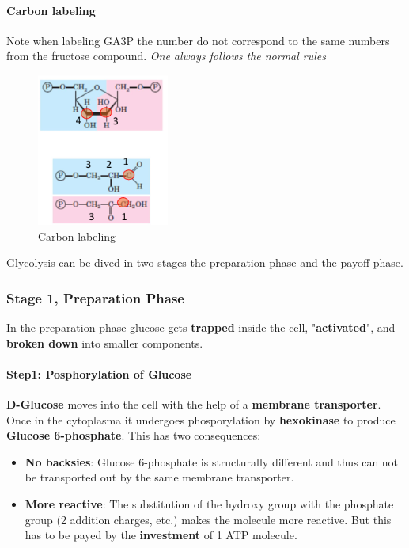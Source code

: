 \documentclass[../main.tex]{subfiles}
\begin{document}
\paragraph{Carbon labeling}
Note when labeling GA3P the number do not correspond to the same numbers from the fructose compound. \textit{One always follows the normal rules}
\begin{figure}[H]
	\centering
	\includegraphics[height = 5cm]{labeling}
	\caption{Carbon labeling}
\end{figure}

Glycolysis can be dived in two stages the preparation phase and the payoff phase. 

\subsubsection{Stage 1, Preparation Phase}
In the preparation phase glucose gets \textbf{trapped} inside the cell, "\textbf{activated}", and \textbf{broken down} into smaller components.  
\paragraph{Step1: Posphorylation of Glucose}
\textbf{D-Glucose} moves into the cell with the help of a \textbf{membrane transporter}. Once in the cytoplasma it undergoes phosporylation by \textbf{hexokinase} to produce \textbf{Glucose 6-phosphate}. This has two consequences: 
\begin{itemize}
	\item \textbf{No backsies}: Glucose 6-phosphate is structurally different and thus can not be transported out by the same membrane transporter. 
	\item \textbf{More reactive}: The substitution of the hydroxy group with the phosphate group (2 addition charges, etc.) makes the molecule more reactive. But this has to be payed by the \textbf{investment} of 1 ATP molecule.
\end{itemize}
\end{document}
